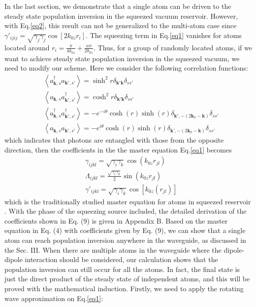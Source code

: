 \documentclass[aps,showpacs,twocolumn,twoside,groupedaddress]{revtex4}
\let\vec\bm
\begin{document}
In the last section, we demonstrate that a single atom can be driven to the steady state population inversion in the squeezed vacuum reservoir. However, with Eq.\eqref{eq2}, this result can not be generalized to the multi-atom case since $\gamma'_{ijij}=\sqrt{\gamma_{j}\gamma_{j}}\cos[2k_{0z}r_{i}]$. The squeezing term in Eq.\eqref{eq1} vanishes for atoms located around $r_i=\frac{\pi}{4k_{0z}}+\frac{n\pi}{2k_{0z}}$. Thus, for a group of randomly located atoms, if we want to achieve steady state population inversion in the squeezed vacuum, we need to modify our scheme. Here we consider the following correlation functions:
\begin{equation}
\label{eq0b}
\begin{split}
& \left\langle a_{\vec{k},s}^{\dagger}a_{\vec{k}',s'}\right\rangle =\sinh^{2}r\delta_{\vec{k}'\vec{k}}\delta_{ss'} \\
& \left\langle a_{\vec{k},s}a_{\vec{k}',s'}^{\dagger}\right\rangle =\cosh^{2}r\delta_{\vec{k}'\vec{k}}\delta_{ss'}\\
& \left\langle a_{\vec{k},s}^{\dagger}a_{\vec{k}',s'}^{\dagger}\right\rangle =-e^{-i\theta}\cosh(r)\sinh(r)\delta_{\vec{k}',-(2\vec{k}_{0}-\vec{k})}\delta_{ss'}\\
&\left\langle a_{\vec{k},s}a_{\vec{k}',s'}\right\rangle =-e^{i\theta}\cosh(r)\sinh(r)\delta_{\vec{k}',-(2\vec{k}_{0}-\vec{k})}\delta_{ss'}
\end{split}
\end{equation}
which indicates that photons are entangled with those from the opposite direction, then the coefficients in the the master equation Eq.\eqref{eq1} becomes 
\begin{equation}
\label{eq2b}
\begin{split}
& \gamma_{ijkl}=\sqrt{\gamma_{i}\gamma_{k}}\cos(k_{0z}r_{jl}) \\
& \Lambda_{ijkl}=\frac{\sqrt{\gamma_{i}\gamma_{k}}}{2}\sin(k_{0z}r_{jl})\\
& \gamma'_{ijkl}=\sqrt{\gamma_{i}\gamma_{k}}\cos[k_{0z}(r_{jl})]
\end{split}
\end{equation}
which is the traditionally studied master equation for atoms in squeezed reservoir \cite{tanas2004stationary}. With the phase of the squeezing source included, the detailed derivation of the coefficients shown in Eq. (9) is given in Appendix B. Based on the master equation in Eq. (4) with coefficients given by Eq. (9), we can show that a single atom can reach population inversion anywhere in the waveguide, as discussed in the Sec. III. When there are multiple atoms in the waveguide where the dipole-dipole interaction should be considered, our calculation shows that the population inversion can still occur for all the atoms. In fact, the final state is just the direct product of the steady state of independent atoms, and this will be proved with the mathematical induction. Firstly, we need to apply the rotating wave approximation on Eq.\eqref{eq1}: 
\end{document}
